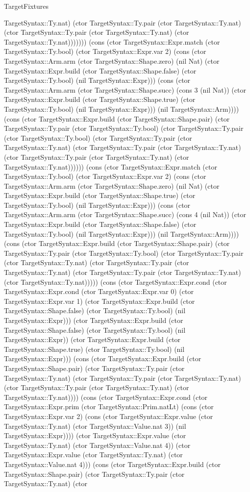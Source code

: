 \begin{lexlean}{TargetFixtures}
\begin{semanticmodule}
{TargetSyntax::Ty.nat) (ctor TargetSyntax::Ty.pair (ctor TargetSyntax::Ty.nat) (ctor TargetSyntax::Ty.pair (ctor TargetSyntax::Ty.nat) (ctor TargetSyntax::Ty.nat))))))) (cons (ctor TargetSyntax::Expr.match (ctor TargetSyntax::Ty.bool) (ctor TargetSyntax::Expr.var 2) (cons (ctor TargetSyntax::Arm.arm (ctor TargetSyntax::Shape.zero) (nil Nat) (ctor TargetSyntax::Expr.build (ctor TargetSyntax::Shape.false) (ctor TargetSyntax::Ty.bool) (nil TargetSyntax::Expr))) (cons (ctor TargetSyntax::Arm.arm (ctor TargetSyntax::Shape.succ) (cons 3 (nil Nat)) (ctor TargetSyntax::Expr.build (ctor TargetSyntax::Shape.true) (ctor TargetSyntax::Ty.bool) (nil TargetSyntax::Expr))) (nil TargetSyntax::Arm)))) (cons (ctor TargetSyntax::Expr.build (ctor TargetSyntax::Shape.pair) (ctor TargetSyntax::Ty.pair (ctor TargetSyntax::Ty.bool) (ctor TargetSyntax::Ty.pair (ctor TargetSyntax::Ty.bool) (ctor TargetSyntax::Ty.pair (ctor TargetSyntax::Ty.nat) (ctor TargetSyntax::Ty.pair (ctor TargetSyntax::Ty.nat) (ctor TargetSyntax::Ty.pair (ctor TargetSyntax::Ty.nat) (ctor TargetSyntax::Ty.nat)))))) (cons (ctor TargetSyntax::Expr.match (ctor TargetSyntax::Ty.bool) (ctor TargetSyntax::Expr.var 2) (cons (ctor TargetSyntax::Arm.arm (ctor TargetSyntax::Shape.zero) (nil Nat) (ctor TargetSyntax::Expr.build (ctor TargetSyntax::Shape.true) (ctor TargetSyntax::Ty.bool) (nil TargetSyntax::Expr))) (cons (ctor TargetSyntax::Arm.arm (ctor TargetSyntax::Shape.succ) (cons 4 (nil Nat)) (ctor TargetSyntax::Expr.build (ctor TargetSyntax::Shape.false) (ctor TargetSyntax::Ty.bool) (nil TargetSyntax::Expr))) (nil TargetSyntax::Arm)))) (cons (ctor TargetSyntax::Expr.build (ctor TargetSyntax::Shape.pair) (ctor TargetSyntax::Ty.pair (ctor TargetSyntax::Ty.bool) (ctor TargetSyntax::Ty.pair (ctor TargetSyntax::Ty.nat) (ctor TargetSyntax::Ty.pair (ctor TargetSyntax::Ty.nat) (ctor TargetSyntax::Ty.pair (ctor TargetSyntax::Ty.nat) (ctor TargetSyntax::Ty.nat))))) (cons (ctor TargetSyntax::Expr.cond (ctor TargetSyntax::Expr.cond (ctor TargetSyntax::Expr.var 0) (ctor TargetSyntax::Expr.var 1) (ctor TargetSyntax::Expr.build (ctor TargetSyntax::Shape.false) (ctor TargetSyntax::Ty.bool) (nil TargetSyntax::Expr))) (ctor TargetSyntax::Expr.build (ctor TargetSyntax::Shape.false) (ctor TargetSyntax::Ty.bool) (nil TargetSyntax::Expr)) (ctor TargetSyntax::Expr.build (ctor TargetSyntax::Shape.true) (ctor TargetSyntax::Ty.bool) (nil TargetSyntax::Expr))) (cons (ctor TargetSyntax::Expr.build (ctor TargetSyntax::Shape.pair) (ctor TargetSyntax::Ty.pair (ctor TargetSyntax::Ty.nat) (ctor TargetSyntax::Ty.pair (ctor TargetSyntax::Ty.nat) (ctor TargetSyntax::Ty.pair (ctor TargetSyntax::Ty.nat) (ctor TargetSyntax::Ty.nat)))) (cons (ctor TargetSyntax::Expr.cond (ctor TargetSyntax::Expr.prim (ctor TargetSyntax::Prim.natLt) (cons (ctor TargetSyntax::Expr.var 2) (cons (ctor TargetSyntax::Expr.value (ctor TargetSyntax::Ty.nat) (ctor TargetSyntax::Value.nat 3)) (nil TargetSyntax::Expr)))) (ctor TargetSyntax::Expr.value (ctor TargetSyntax::Ty.nat) (ctor TargetSyntax::Value.nat 4)) (ctor TargetSyntax::Expr.value (ctor TargetSyntax::Ty.nat) (ctor TargetSyntax::Value.nat 4))) (cons (ctor TargetSyntax::Expr.build (ctor TargetSyntax::Shape.pair) (ctor TargetSyntax::Ty.pair (ctor TargetSyntax::Ty.nat) (ctor }
\end{semanticmodule}
\end{lexlean}
